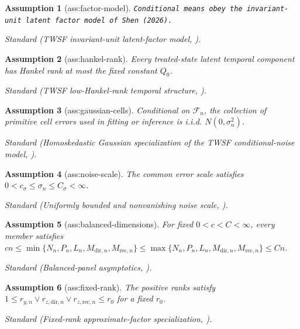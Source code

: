 \documentclass{article}
\newtheorem{assumption}{Assumption}
\begin{document}
\begin{assumption}[ass:factor-model]\label{ass:factor-model}
\texttt{Conditional means obey the invariant-\allowbreak{}unit latent factor model of Shen (2026).}
\par\smallskip\noindent\emph{Standard} (TWSF invariant-unit latent-factor model, \cite{Shen2026TWSF}).
\end{assumption}

\begin{assumption}[ass:hankel-rank]\label{ass:hankel-rank}
Every treated-state latent temporal component has Hankel rank at most the fixed constant \(Q_0\).
\par\smallskip\noindent\emph{Standard} (TWSF low-Hankel-rank temporal structure, \cite{Shen2026TWSF}).
\end{assumption}

\begin{assumption}[ass:gaussian-cells]\label{ass:gaussian-cells}
Conditional on \(\mathcal F_n\), the collection of primitive cell errors used in fitting or inference is i.i.d. \(N(0,\sigma_n^2)\).
\par\smallskip\noindent\emph{Standard} (Homoskedastic Gaussian specialization of the TWSF conditional-noise model, \cite{Shen2026TWSF}).
\end{assumption}

\begin{assumption}[ass:noise-scale]\label{ass:noise-scale}
The common error scale satisfies \(0<c_\sigma\le\sigma_n\le C_\sigma<\infty\).
\par\smallskip\noindent\emph{Standard} (Uniformly bounded and nonvanishing noise scale, \cite{Shen2026TWSF}).
\end{assumption}

\begin{assumption}[ass:balanced-dimensions]\label{ass:balanced-dimensions}
For fixed \(0<c<C<\infty\), every member satisfies \(cn\le\min\{N_n,P_n,L_n,M_{\mathrm{dir},n},M_{\mathrm{rec},n}\}\le\max\{N_n,P_n,L_n,M_{\mathrm{dir},n},M_{\mathrm{rec},n}\}\le Cn\).
\par\smallskip\noindent\emph{Standard} (Balanced-panel asymptotics, \cite{Shen2026TWSF}).
\end{assumption}

\begin{assumption}[ass:fixed-rank]\label{ass:fixed-rank}
The positive ranks satisfy \(1\le r_{y,n}\vee r_{z,\mathrm{dir},n}\vee r_{z,\mathrm{rec},n}\le r_0\) for a fixed \(r_0\).
\par\smallskip\noindent\emph{Standard} (Fixed-rank approximate-factor specialization, \cite{Shen2026TWSF}).
\end{assumption}
\end{document}
